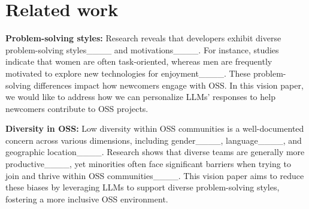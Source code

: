 \section{Related work}
\label{sec:backrelated}

\textbf{Problem-solving styles:} Research reveals that developers exhibit diverse problem-solving styles____ and motivations____. For instance, studies indicate that women are often task-oriented, whereas men are frequently motivated to explore new technologies for enjoyment____. These problem-solving differences impact how newcomers engage with OSS. In this vision paper, we would like to address how we can personalize LLMs' responses to help newcomers contribute to OSS projects.

\textbf{Diversity in OSS:} Low diversity within OSS communities is a well-documented concern across various dimensions, including gender____, language____, and geographic location____. Research shows that diverse teams are generally more productive____, yet minorities often face significant barriers when trying to join and thrive within OSS communities____. %
This vision paper aims to reduce these biases by leveraging LLMs to support diverse problem-solving styles, fostering a more inclusive OSS environment.